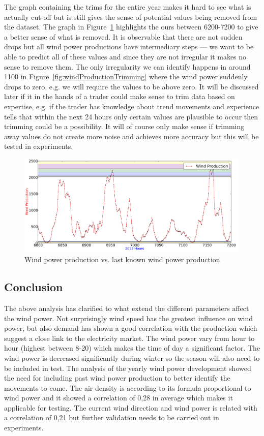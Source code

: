 The graph containing the trims for the entire year makes it hard to see what is actually cut-off but is still gives the sense of potential values being removed from the dataset. The graph in Figure~\ref{fig:pointingOutPlaceWhereTrim} highlights the ours between 6200-7200 to give a better sense of what is removed. It is observable that there are not sudden drops but all wind power productions have intermediary steps --- we want to be able to predict all of these values and since they are not irregular it makes no sense to remove them. The only irregularity we can identify happens in around 1100 in Figure~\ref{fig:windProductionTrimming} where the wind power suddenly drops to zero, e.g. we will require the values to be above zero. It will be discussed later if it in the hands of a trader could make sense to trim data based on expertise, e.g. if the trader has knowledge about trend movements and experience tells that within the next 24 hours only certain values are plausible to occur then trimming could be a possibility. It will of course only make sense if trimming away values do not create more noise and achieves more accuracy but this will be tested in experiments.

\begin{figure}[ht!]
\centering
\includegraphics[width=0.99\textwidth]{billeder/pointingOutPlaceWhereTrim.png}
\caption{Wind power production vs. last known wind power production}
\label{fig:pointingOutPlaceWhereTrim}
\end{figure}

\subsection{Conclusion}
The above analysis has clarified to what extend the different parameters affect the wind power. Not surprisingly wind speed has the greatest influence on wind power, but also demand has shown a good correlation with the production which suggest a close link to the electricity market. The wind power vary from hour to hour (highest between 8-20) which makes the time of day a significant factor. The wind power is decreased significantly during winter so the season will also need to be included in test. The analysis of the yearly wind power development showed the need for including past wind power production to better identify the movements to come.
The air density is according to its formula proportional to wind power and it showed a correlation of 0,28 in average which makes it applicable for testing. The current wind direction and wind power is related with a correlation of 0,21 but further validation needs to be carried out in experiments.